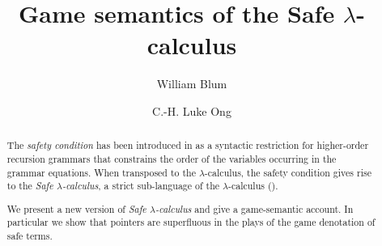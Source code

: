 \documentclass{llncs}
\begin{document}
%
\frontmatter          %
%
\pagestyle{headings}  %
%

\mainmatter              %
%
\title{Game semantics of the Safe $\lambda$-calculus}
%
%
\author{William Blum \and C.-H. Luke Ong}
%
%
%


\maketitle              %


\newcommand\ialgol{\textsf{IA}}
\newcommand\pcf{\textsf{PCF}}
\newtheorem{thm}{Theorem}
\pagestyle{empty}



\begin{abstract}
The \emph{safety condition} has been introduced in \cite{KNU02} as a
syntactic restriction for higher-order recursion grammars that
constrains the order of the variables occurring in the grammar
equations. When transposed to the $\lambda$-calculus, the safety condition
gives rise to the \emph{Safe $\lambda$-calculus}, a strict
sub-language of the $\lambda$-calculus (\cite{safety-mirlong2004}).

We present a new version of \emph{Safe $\lambda$-calculus} and 
give a game-semantic account. In particular we show that
pointers are superfluous in the plays of the game denotation of safe terms.
\end{abstract}
\end{document}
